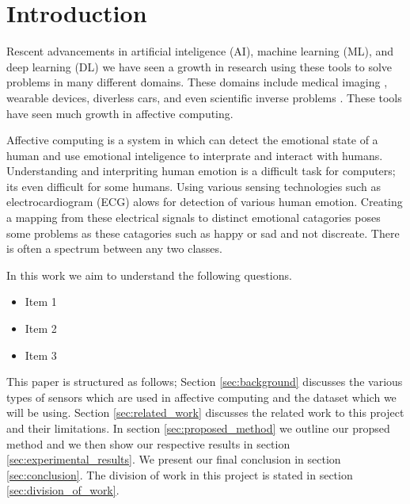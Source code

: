 \section{Introduction}
Rescent advancements in
artificial inteligence (AI),
machine learning (ML),
and deep learning (DL)
we have seen a growth in
research using these tools to
solve problems in many different domains.
These domains include medical imaging \cite{Greenspan:2016},
wearable devices,
diverless cars,
and even scientific inverse problems \cite{laanait2019exascale}.
These tools have seen much growth in affective computing.

Affective computing is a system in which can detect the
emotional state of a human and use emotional inteligence
to interprate and interact with humans.
Understanding and interpriting human emotion is a
difficult task for computers;
its even difficult for some humans.
Using various sensing technologies such as electrocardiogram (ECG)
alows for detection of various human emotion.
Creating a mapping from these electrical signals to
distinct emotional catagories poses some problems as
these catagories such as happy or sad and not discreate.
There is often a spectrum between any two classes.


In this work we aim to understand the following questions.
\begin{itemize}
    \item Item 1
    \item Item 2
    \item Item 3
\end{itemize}

This paper is structured as follows;
Section \ref{sec:background} discusses the various types of sensors
which are used in affective computing and the dataset which we will be using.
%
Section \ref{sec:related_work} discusses the related work to this project
and their limitations.
%
In section \ref{sec:proposed_method} we outline our propsed method
and we then show our respective results in section \ref{sec:experimental_results}.
%
We present our final conclusion in section \ref{sec:conclusion}.
%
The division of work in this project is stated in section
\ref{sec:division_of_work}.
